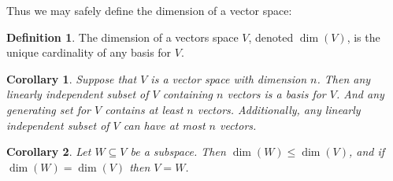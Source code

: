 \documentclass[oneside, 12pt]{book}
\newtheorem{cor}{Corollary}[section]
\theoremstyle{definition}
\newtheorem{defn}{Definition}[section]
\begin{document}
Thus we may safely define the dimension of a vector space:
\begin{defn}
\label{defn_dim}
The dimension of a vectors space $V$, denoted $\dim(V)$, is the unique cardinality of any basis for $V$.
\end{defn}
\begin{cor}
\label{cor_base}
Suppose that $V$ is a vector space with dimension $n$. Then any linearly independent subset of $V$ containing $n$ vectors is a basis for $V$.
And any generating set for $V$ contains at least $n$ vectors.
Additionally, any linearly independent subset of $V$ can have at most $n$ vectors.
\end{cor}
\begin{cor}
\label{cor_bassub}
Let $W\subseteq V$ be a subspace. Then $\dim(W)\leq \dim(V)$, and if $\dim(W)=\dim(V)$ then $V=W$.
\end{cor}
\end{document}
